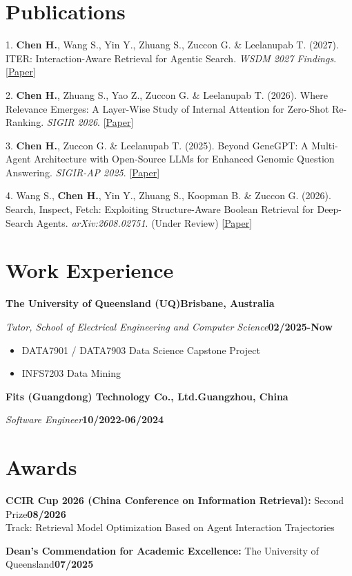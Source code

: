 \documentclass[10pt]{article}
\newcommand{\org}[2]{\textbf{#1}\hfill\textbf{#2}\par}
\newcommand{\role}[2]{\textit{#1}\hfill\textbf{#2}}
\newcommand{\plink}[2]{[\href{#2}{\color{blue}\underline{#1}}]}
\newcommand{\me}{\textbf{Chen H.}}
\newcommand{\entrygap}{\par\vspace{14.04pt}}
\newcommand{\pubgap}{\par\vspace{7.7pt}}
\begin{document}
\section{Publications}
1. \me, Wang S., Yin Y., Zhuang S., Zuccon G. \& Leelanupab T. (2027). ITER: Interaction-Aware Retrieval for
Agentic Search. \textit{WSDM 2027 Findings}.
\plink{Paper}{https://arxiv.org/pdf/2608.27912}
\pubgap
2. \me, Zhuang S., Yao Z., Zuccon G. \& Leelanupab T. (2026). Where Relevance Emerges: A Layer-Wise Study of
Internal Attention for Zero-Shot Re-Ranking. \textit{SIGIR 2026}.
\plink{Paper}{https://dl.acm.org/doi/pdf/10.1145/3805712.3808558}
\pubgap
3. \me, Zuccon G. \& Leelanupab T. (2025). Beyond GeneGPT: A Multi-Agent Architecture with Open-Source LLMs
for Enhanced Genomic Question Answering. \textit{SIGIR-AP 2025}.
\plink{Paper}{https://dl.acm.org/doi/pdf/10.1145/3767695.3769488}
\pubgap
4. Wang S., \me, Yin Y., Zhuang S., Koopman B. \& Zuccon G. (2026). Search, Inspect, Fetch: Exploiting
Structure-Aware Boolean Retrieval for Deep-Search Agents. \textit{arXiv:2608.02751}. (Under Review)
\plink{Paper}{https://arxiv.org/pdf/2608.02751}
\par

\section{Work Experience}
\org{The University of Queensland (UQ)}{Brisbane, Australia}
\role{Tutor, School of Electrical Engineering and Computer Science}{02/2025-Now}
\begin{itemize}
  \item DATA7901 / DATA7903 Data Science Capstone Project
  \item INFS7203 Data Mining
\end{itemize}
\entrygap
\org{Fits (Guangdong) Technology Co., Ltd.}{Guangzhou, China}
\role{Software Engineer}{10/2022-06/2024}\par

\section{Awards}
\textbf{CCIR Cup 2026 (China Conference on Information Retrieval):} Second Prize\hfill\textbf{08/2026}\\
Track: Retrieval Model Optimization Based on Agent Interaction Trajectories\par
\textbf{Dean's Commendation for Academic Excellence:} The University of Queensland\hfill\textbf{07/2025}\par
\end{document}
